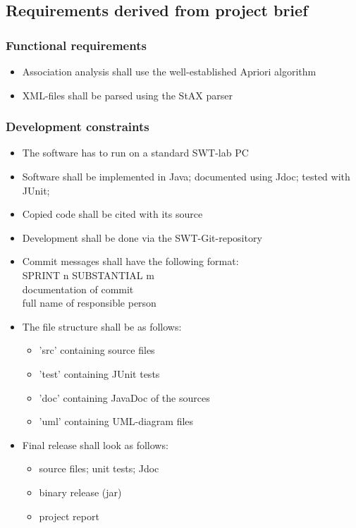 \subsection{Requirements derived from project brief}
\subsubsection{Functional requirements}
\begin{itemize}	
	\item Association analysis shall use the well-established Apriori algorithm
	\item XML-files shall be parsed using the StAX parser
	
\end{itemize}

\subsubsection{Development constraints}
\begin{itemize}
	\item The software has to run on a standard SWT-lab PC
	\item Software shall be implemented in Java; documented using Jdoc; tested with JUnit;
	\item Copied code shall be cited with its source
	\item Development shall be done via the SWT-Git-repository
	\item Commit messages shall have the following format: \\
	SPRINT n SUBSTANTIAL m \\
	documentation of commit \\
	full name of responsible person
	\item The file structure shall be as follows:
	\begin{itemize}
		\item 'src' containing source files
		\item 'test' containing JUnit tests
		\item 'doc' containing JavaDoc of the sources
		\item 'uml' containing UML-diagram files
	\end{itemize}
	\item Final release shall look as follows:
	\begin{itemize}
		\item source files; unit tests; Jdoc
		\item binary release (jar)
		\item project report
	\end{itemize}
	
\end{itemize}
